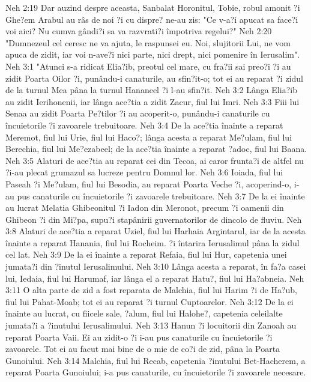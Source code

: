 Neh 2:19  Dar auzind despre aceasta, Sanbalat Horonitul, Tobie, robul amonit ?i Ghe?em Arabul au râs de noi ?i cu dispre? ne-au zis: "Ce v-a?i apucat sa face?i voi aici? Nu cumva gândi?i sa va razvrati?i împotriva regelui?"
Neh 2:20  "Dumnezeul cel ceresc ne va ajuta, le raspunsei eu. Noi, slujitorii Lui, ne vom apuca de zidit, iar voi n-ave?i nici parte, nici drept, nici pomenire în Ierusalim".
Neh 3:1  "Atunci s-a ridicat Elia?ib, preotul cel mare, cu fra?ii sai preo?i ?i au zidit Poarta Oilor ?i, punându-i canaturile, au sfin?it-o; tot ei au reparat ?i zidul de la turnul Mea pâna la turnul Hananeel ?i l-au sfin?it.
Neh 3:2  Lânga Elia?ib au zidit Ierihonenii, iar lânga ace?tia a zidit Zacur, fiul lui Imri.
Neh 3:3  Fiii lui Senaa au zidit Poarta Pe?tilor ?i au acoperit-o, punându-i canaturile cu încuietorile ?i zavoarele trebuitoare.
Neh 3:4  De la ace?tia înainte a reparat Meremot, fiul lui Urie, fiul lui Haco?; lânga acesta a reparat Me?ulam, fiul lui Berechia, fiul lui Me?ezabeel; de la ace?tia înainte a reparat ?adoc, fiul lui Baana.
Neh 3:5  Alaturi de ace?tia au reparat cei din Tecoa, ai caror frunta?i de altfel nu ?i-au plecat grumazul sa lucreze pentru Domnul lor.
Neh 3:6  Ioiada, fiul lui Paseah ?i Me?ulam, fiul lui Besodia, au reparat Poarta Veche ?i, acoperind-o, i-au pus canaturile cu încuietorile ?i zavoarele trebuitoare.
Neh 3:7  De la ei înainte au lucrat Melatia Ghibeonitul ?i Iadon din Meronot, precum ?i oamenii din Ghibeon ?i din Mi?pa, supu?i stapânirii guvernatorilor de dincolo de fluviu.
Neh 3:8  Alaturi de ace?tia a reparat Uziel, fiul lui Harhaia Argintarul, iar de la acesta înainte a reparat Hanania, fiul lui Rocheim. ?i întarira Ierusalimul pâna la zidul cel lat.
Neh 3:9  De la ei înainte a reparat Refaia, fiul lui Hur, capetenia unei jumata?i din ?inutul Ierusalimului.
Neh 3:10  Lânga acesta a reparat, în fa?a casei lui, Iedaia, fiul lui Harumaf, iar lânga el a reparat Hatu?, fiul lui Ha?abneia.
Neh 3:11  O alta parte de zid a fost reparata de Malchia, fiul lui Harim ?i de Ha?ub, fiul lui Pahat-Moab; tot ei au reparat ?i turnul Cuptoarelor.
Neh 3:12  De la ei înainte au lucrat, cu fiicele sale, ?alum, fiul lui Halohe?, capetenia celeilalte jumata?i a ?inutului Ierusalimului.
Neh 3:13  Hanun ?i locuitorii din Zanoah au reparat Poarta Vaii. Ei au zidit-o ?i i-au pus canaturile cu încuietorile ?i zavoarele. Tot ei au facut mai bine de o mie de co?i de zid, pâna la Poarta Gunoiului.
Neh 3:14  Malchia, fiul lui Recab, capetenia ?inutului Bet-Hacherem, a reparat Poarta Gunoiului; i-a pus canaturile, cu încuietorile ?i zavoarele necesare.
